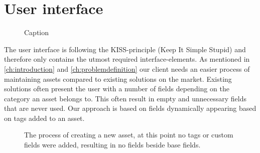 \section{User interface}\label{sc:userinterface}

\begin{figure}[H]
    \centering
    \caption{Caption}
    \label{fig:too}
\end{figure}


The user interface is following the KISS-principle (Keep It Simple Stupid) and therefore only contains the utmost required interface-elements. As mentioned in \autoref{ch:introduction} and \autoref{ch:problemdefinition} our client needs an easier process of maintaining assets compared to existing solutions on the market. Existing solutions often present the user with a number of fields depending on the category an asset belongs to. This often result in empty and unnecessary fields that are never used. Our approach is based on fields dynamically appearing based on tags added to an asset.

\begin{figure}[H]
    \centering
    \caption{The process of creating a new asset, at this point no tags or custom fields were added, resulting in no fields beside base fields.}
    \label{fig:add-asset-no-tags}
\end{figure}

